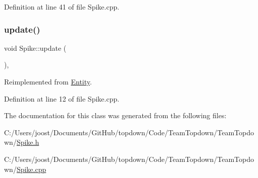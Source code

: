 Definition at line 41 of file Spike.\+cpp.

\mbox{\label{class_spike_a5f1fc626e9f58f4a08a002c6d2549942}} 
\subsubsection{\texorpdfstring{update()}{update()}}
{\footnotesize\ttfamily void Spike\+::update (\begin{DoxyParamCaption}{ }\end{DoxyParamCaption})\hspace{0.3cm}{\ttfamily [override]}, {\ttfamily [virtual]}}



Reimplemented from \hyperlink{class_entity_aed73e98b980b85833428c935cc1c69f8}{Entity}.



Definition at line 12 of file Spike.\+cpp.



The documentation for this class was generated from the following files\+:\begin{DoxyCompactItemize}
\item 
C\+:/\+Users/joost/\+Documents/\+Git\+Hub/topdown/\+Code/\+Team\+Topdown/\+Team\+Topdown/\hyperlink{_spike_8h}{Spike.\+h}\item 
C\+:/\+Users/joost/\+Documents/\+Git\+Hub/topdown/\+Code/\+Team\+Topdown/\+Team\+Topdown/\hyperlink{_spike_8cpp}{Spike.\+cpp}\end{DoxyCompactItemize}
